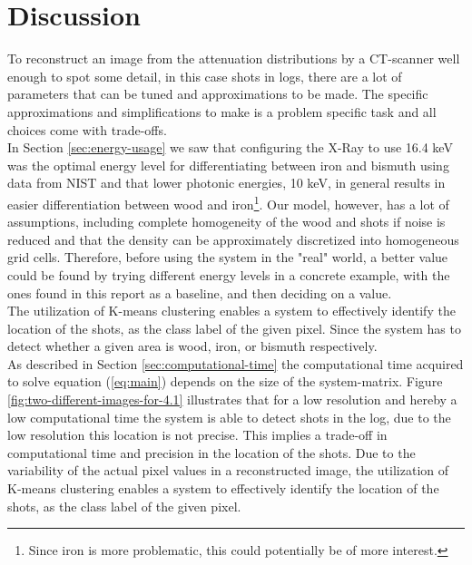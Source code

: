 \documentclass{article}
\begin{document}
\section{Discussion}\label{sec:discussion}
\vspace*{-0.3\baselineskip}
To reconstruct an image from the attenuation distributions by a CT-scanner well enough to spot some detail, in this case shots in logs, there are a lot of parameters that can be tuned and approximations to be made. The specific approximations and simplifications to make is a problem specific task and all choices come with trade-offs. \\
In Section \ref{sec:energy-usage} we saw that configuring the X-Ray to use 16.4 keV was the optimal energy level for differentiating between iron and bismuth using data from NIST and that lower photonic energies, 10 keV, in general results in easier differentiation between wood and iron\footnote[12]{Since iron is more problematic, this could potentially be of more interest.}. Our model, however, has a lot of assumptions, including complete homogeneity of the wood and shots if noise is reduced and that the density can be approximately discretized into homogeneous grid cells. Therefore, before using the system in the "real" world, a better value could be found by trying different energy levels in a concrete example, with the ones found in this report as a baseline, and then deciding on a value. \\
The utilization of K-means clustering enables a system to effectively identify the location of the shots, as the class label of the given pixel. Since the system has to detect whether a given area is wood, iron, or bismuth respectively. \\
As described in Section \ref{sec:computational-time} the computational time acquired to solve equation (\ref{eq:main}) depends on the size of the system-matrix. Figure \ref{fig:two-different-images-for-4.1} illustrates that for a low resolution and hereby a low computational time the system is able to detect shots in the log, due to the low resolution this location is not precise. This implies a trade-off in computational time and precision in the location of the shots. 
Due to the variability of the actual pixel values in a reconstructed image, the utilization of K-means clustering enables a system to effectively identify the location of the shots, as the class label of the given pixel. 
\end{document}
